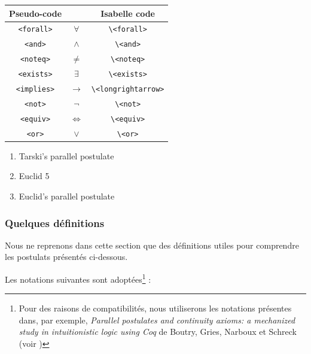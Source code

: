 \documentclass[8pt,a4paper]{article}
\theoremstyle{plain}
\begin{document}
\begin{tabular}{|c|c|c|}
  \hline
  Pseudo-code & & Isabelle code \\
  \hline
  \verb+<forall>+ & $\forall$ & \verb+\<forall>+ \\
  \verb+<and>+ & $\wedge$ & \verb+\<and>+\\
  \verb+<noteq>+ & $\neq$ & \verb+\<noteq>+\\
  \verb+<exists>+ & $\exists$ & \verb+\<exists>+\\
  \verb+<implies>+ & $\rightarrow$ & \verb+\<longrightarrow>+ \\
  \verb+<not>+ & $\lnot$&\verb+\<not>+\\
  \verb+<equiv>+ & $\Longleftrightarrow$ & \verb+\<equiv>+ \\
  \verb+<or>+ & $\lor$ & \verb+\<or>+\\
  \hline
  
\end{tabular}

  \begin{enumerate}
  \item Tarski's parallel postulate
  \item Euclid 5
  \item Euclid's parallel postulate
  \end{enumerate}


  \subsubsection{Quelques définitions}
Nous ne reprenons dans cette section que des définitions utiles pour comprendre les postulats présentés ci-dessous.

Les notations suivantes sont adoptées\footnote{Pour des raisons de compatibilités,
nous utiliserons les notations présentes dans, par exemple,
\textit{Parallel postulates and continuity axioms: a mechanized study in intuitionistic logic using Coq} de Boutry, Gries, Narboux et Schreck
(voir \cite{boutry2019parallel})}
 :
\end{document}
